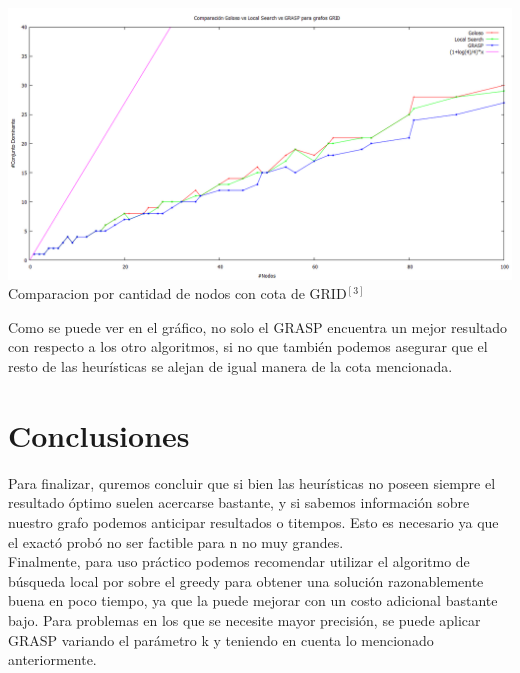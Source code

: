 \begin{center}
\includegraphics[width=17cm]{./graficos/comparacion_heuristicas_cd.png}\\
Comparacion por cantidad de nodos con cota de GRID$^{[3]}$
\end{center}

Como se puede ver en el gráfico, no solo el GRASP encuentra un mejor resultado con respecto a los otro algoritmos, si no que también
podemos asegurar que el resto de las heurísticas se alejan de igual manera de la cota mencionada.


\section{Conclusiones}
Para finalizar, quremos concluir que si bien las heurísticas no poseen siempre el resultado óptimo
suelen acercarse bastante, y si sabemos información sobre nuestro grafo podemos anticipar resultados 
o titempos. Esto es necesario ya que el exactó probó no ser factible para n no muy grandes.\\
Finalmente, para uso práctico podemos recomendar utilizar el algoritmo de búsqueda local por sobre el greedy para obtener
una solución razonablemente buena en poco tiempo, ya que la puede mejorar con un costo adicional bastante bajo. Para problemas
en los que se necesite mayor precisión, se puede aplicar GRASP variando el parámetro k y
teniendo en cuenta lo mencionado anteriormente.



